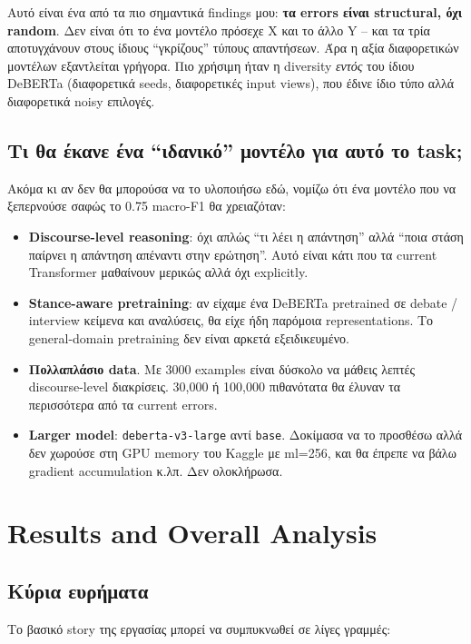 \documentclass[12pt]{fphw}
\begin{document}
Αυτό είναι ένα από τα πιο σημαντικά findings μου: \textbf{τα errors είναι structural, όχι random}. Δεν είναι ότι το ένα μοντέλο πρόσεχε X και το άλλο Y -- και τα τρία αποτυγχάνουν στους ίδιους ``γκρίζους'' τύπους απαντήσεων. Άρα η αξία διαφορετικών μοντέλων εξαντλείται γρήγορα. Πιο χρήσιμη ήταν η diversity \emph{εντός} του ίδιου DeBERTa (διαφορετικά seeds, διαφορετικές input views), που έδινε ίδιο τύπο αλλά διαφορετικά noisy επιλογές.

\subsection{Τι θα έκανε ένα ``ιδανικό'' μοντέλο για αυτό το task;}

Ακόμα κι αν δεν θα μπορούσα να το υλοποιήσω εδώ, νομίζω ότι ένα μοντέλο που να ξεπερνούσε σαφώς το 0.75 macro-F1 θα χρειαζόταν:

\begin{itemize}
    \item \textbf{Discourse-level reasoning}: όχι απλώς ``τι λέει η απάντηση'' αλλά ``ποια στάση παίρνει η απάντηση απέναντι στην ερώτηση''. Αυτό είναι κάτι που τα current Transformer μαθαίνουν μερικώς αλλά όχι explicitly.
    \item \textbf{Stance-aware pretraining}: αν είχαμε ένα DeBERTa pretrained σε debate / interview κείμενα και αναλύσεις, θα είχε ήδη παρόμοια representations. Το general-domain pretraining δεν είναι αρκετά εξειδικευμένο.
    \item \textbf{Πολλαπλάσιο data}. Με 3000 examples είναι δύσκολο να μάθεις λεπτές discourse-level διακρίσεις. 30,000 ή 100,000 πιθανότατα θα έλυναν τα περισσότερα από τα current errors.
    \item \textbf{Larger model}: \texttt{deberta-v3-large} αντί \texttt{base}. Δοκίμασα να το προσθέσω αλλά δεν χωρούσε στη GPU memory του Kaggle με ml=256, και θα έπρεπε να βάλω gradient accumulation κ.λπ. Δεν ολοκλήρωσα.
\end{itemize}

\section{Results and Overall Analysis}

\subsection{Κύρια ευρήματα}

Το βασικό story της εργασίας μπορεί να συμπυκνωθεί σε λίγες γραμμές:
\end{document}
